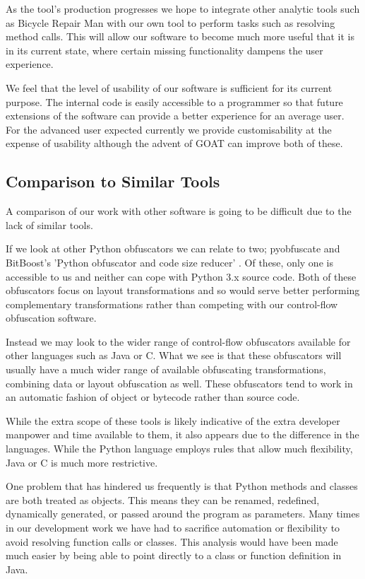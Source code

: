 \documentclass[twoside,a4paper]{report}
\begin{document}
As the tool's production progresses we hope to integrate other analytic tools such as Bicycle Repair Man \cite{bikerepair} with our own tool to
perform tasks such as resolving method calls. This will allow our software to become much more useful that it is in its current state, where certain
missing functionality dampens the user experience.

We feel that the level of usability of our software is sufficient for its current purpose. The internal code is easily accessible to a programmer so that
future extensions of the software can provide a better experience for an average user. For the advanced user expected currently we provide customisability
at the expense of usability although the advent of GOAT can improve both of these.

\subsection{Comparison to Similar Tools}

A comparison of our work with other software is going to be difficult due to the lack of similar tools.

If we look at other Python obfuscators we can relate to two; pyobfuscate \cite{pyobf} and BitBoost's
'Python obfuscator and code size reducer' \cite{bitboost}. Of these, only one is accessible to us and
neither can cope with Python 3.x source code. Both of these obfuscators focus on layout transformations
and so would serve better performing complementary transformations rather than competing with our
control-flow obfuscation software.

Instead we may look to the wider range of control-flow obfuscators available for other languages such as
Java or C. What we see is that these obfuscators will usually have a much wider range of available
obfuscating transformations, combining data or layout obfuscation as well. These obfuscators tend to
work in an automatic fashion of object or bytecode rather than source code.

While the extra scope of these tools is likely indicative of the extra developer manpower and time
available to them, it also appears due to the difference in the languages. While the Python language
employs rules that allow much flexibility, Java or C is much more restrictive.

One problem that has hindered us frequently is that Python methods and classes are both treated as objects.
This means they can be renamed, redefined, dynamically generated, or passed around the program as parameters.
Many times in our development work we have had to sacrifice automation or flexibility to avoid resolving function
calls or classes. This analysis would have been made much easier by being able to point directly to a class or
function definition in Java.
\end{document}
